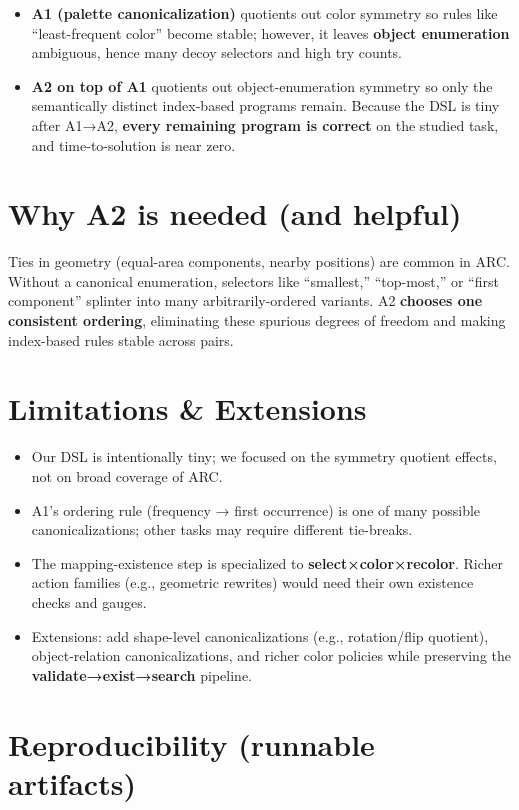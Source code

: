 \documentclass[11pt]{article}
\begin{document}
\begin{itemize}
\item \textbf{A1 (palette canonicalization)} quotients out color symmetry so rules like ``least-frequent color'' become stable; however, it leaves \textbf{object enumeration} ambiguous, hence many decoy selectors and high try counts.
\item \textbf{A2 on top of A1} quotients out object-enumeration symmetry so only the semantically distinct index-based programs remain. Because the DSL is tiny after A1→A2, \textbf{every remaining program is correct} on the studied task, and time-to-solution is near zero.
\end{itemize}

\section{Why A2 is needed (and helpful)}

Ties in geometry (equal-area components, nearby positions) are common in ARC. Without a canonical enumeration, selectors like ``smallest,'' ``top-most,'' or ``first component'' splinter into many arbitrarily-ordered variants. A2 \textbf{chooses one consistent ordering}, eliminating these spurious degrees of freedom and making index-based rules stable across pairs.

\section{Limitations \& Extensions}

\begin{itemize}
\item Our DSL is intentionally tiny; we focused on the symmetry quotient effects, not on broad coverage of ARC.
\item A1's ordering rule (frequency → first occurrence) is one of many possible canonicalizations; other tasks may require different tie-breaks.
\item The mapping-existence step is specialized to \textbf{select×color×recolor}. Richer action families (e.g., geometric rewrites) would need their own existence checks and gauges.
\item Extensions: add shape-level canonicalizations (e.g., rotation/flip quotient), object-relation canonicalizations, and richer color policies while preserving the \textbf{validate→exist→search} pipeline.
\end{itemize}

\section{Reproducibility (runnable artifacts)}
\end{document}
